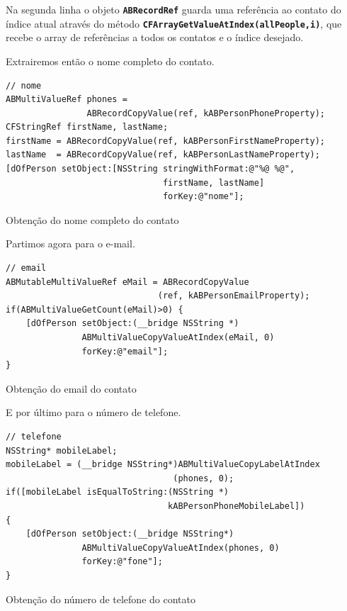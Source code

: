 \documentclass[a4paper,12pt,brazil,doubleside]{book}
\begin{document}
\begin{singlespace}
Na segunda linha o objeto \texttt{\textbf{ABRecordRef}} guarda uma referência ao contato do índice atual através do método \texttt{\textbf{CFArrayGetValueAtIndex(allPeople,i)}}, que recebe o array de referências a todos os contatos e o índice desejado.

Extrairemos então o nome completo do contato.

\begin{listing}[H]
\begin{verbatim}
// nome
ABMultiValueRef phones =
                ABRecordCopyValue(ref, kABPersonPhoneProperty);
CFStringRef firstName, lastName;
firstName = ABRecordCopyValue(ref, kABPersonFirstNameProperty);
lastName  = ABRecordCopyValue(ref, kABPersonLastNameProperty);
[dOfPerson setObject:[NSString stringWithFormat:@"%@ %@",
                               firstName, lastName]
                               forKey:@"nome"];
\end{verbatim}
\caption{Obtenção do nome completo do contato}
\end{listing}


Partimos agora para o e-mail.

\begin{listing}[H]
\begin{verbatim}
// email
ABMutableMultiValueRef eMail = ABRecordCopyValue
                              (ref, kABPersonEmailProperty);
if(ABMultiValueGetCount(eMail)>0) {
    [dOfPerson setObject:(__bridge NSString *)
               ABMultiValueCopyValueAtIndex(eMail, 0)
               forKey:@"email"];
}
\end{verbatim}
\caption{Obtenção do email do contato}
\end{listing}


E por último para o número de telefone.
    
\begin{listing}[H]
\begin{verbatim}
// telefone
NSString* mobileLabel;
mobileLabel = (__bridge NSString*)ABMultiValueCopyLabelAtIndex
                                 (phones, 0);
if([mobileLabel isEqualToString:(NSString *)
                                kABPersonPhoneMobileLabel])
{
    [dOfPerson setObject:(__bridge NSString*)
               ABMultiValueCopyValueAtIndex(phones, 0)
               forKey:@"fone"];
}
\end{verbatim}
\caption{Obtenção do número de telefone do contato}
\end{listing}



\end{singlespace}
\end{document}
